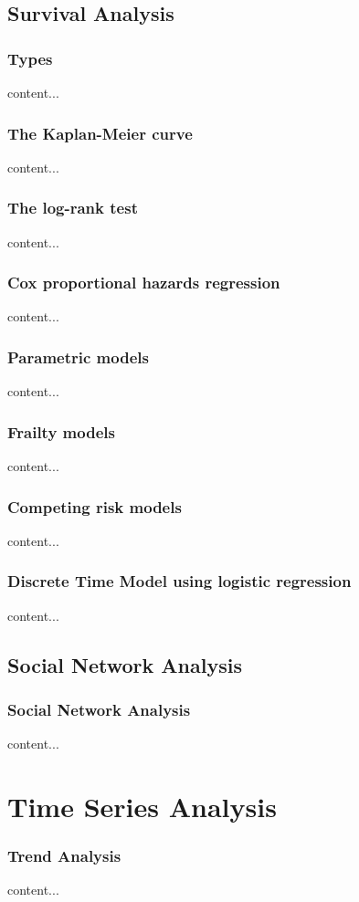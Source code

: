 \documentclass{beamer}
\begin{document}
\subsection{Survival Analysis}
\begin{frame}\frametitle{Types}
content...
\end{frame}

\begin{frame}\frametitle{The Kaplan-Meier curve}
content...
\end{frame}

\begin{frame}\frametitle{The log-rank test}
content...
\end{frame}

\begin{frame}\frametitle{Cox proportional hazards regression}
content...
\end{frame}

\begin{frame}\frametitle{Parametric models}
content...
\end{frame}

\begin{frame}\frametitle{Frailty models}
content...
\end{frame}

\begin{frame}\frametitle{Competing risk models}
content...
\end{frame}

\begin{frame}\frametitle{Discrete Time Model using logistic regression}
content...
\end{frame}



\subsection{Social Network Analysis}
\begin{frame}\frametitle{Social Network Analysis}
	content...
\end{frame}

\section{Time Series Analysis}
\begin{frame}\frametitle{Trend Analysis}
	content...
\end{frame}	
\end{document}

